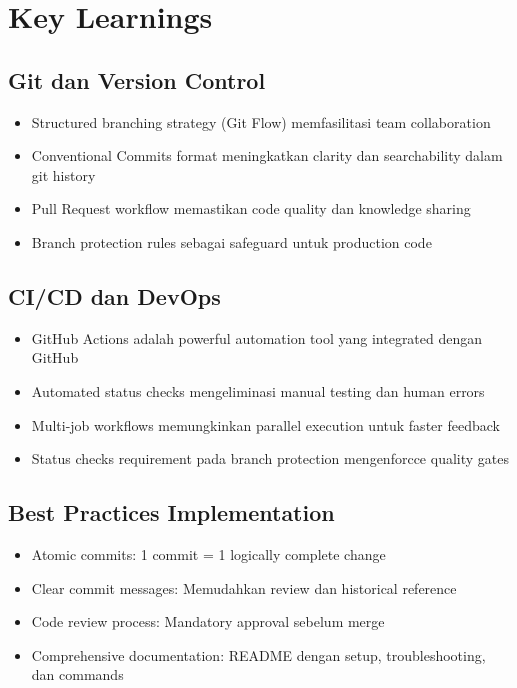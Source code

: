 \documentclass[a4paper,oneside,11pt]{book}
\begin{document}
\section{Key Learnings}

\subsection{Git dan Version Control}

\begin{itemize}
    \item Structured branching strategy (Git Flow) memfasilitasi team collaboration
    \item Conventional Commits format meningkatkan clarity dan searchability dalam git history
    \item Pull Request workflow memastikan code quality dan knowledge sharing
    \item Branch protection rules sebagai safeguard untuk production code
\end{itemize}

\subsection{CI/CD dan DevOps}

\begin{itemize}
    \item GitHub Actions adalah powerful automation tool yang integrated dengan GitHub
    \item Automated status checks mengeliminasi manual testing dan human errors
    \item Multi-job workflows memungkinkan parallel execution untuk faster feedback
    \item Status checks requirement pada branch protection mengenforcce quality gates
\end{itemize}

\subsection{Best Practices Implementation}

\begin{itemize}
    \item Atomic commits: 1 commit = 1 logically complete change
    \item Clear commit messages: Memudahkan review dan historical reference
    \item Code review process: Mandatory approval sebelum merge
    \item Comprehensive documentation: README dengan setup, troubleshooting, dan commands
\end{itemize}
\end{document}
